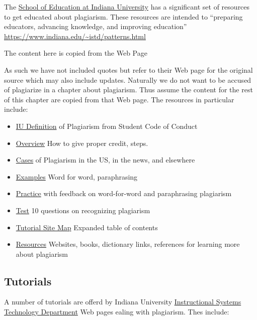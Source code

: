 The \href{http://education.indiana.edu/}{School of Education at Indiana
University} has a significant set of resources to get educated about
plagiarism. These resources are intended to ``preparing educators,
advancing knowledge, and improving education''~\cite{www-iu-plagiarism}
\url{https://www.indiana.edu/~istd/patterns.html}

The content here is copied from the Web Page


As such we have not included quotes but refer to their Web page for the
original source which may also include updates. Naturally we do not want
to be accused of plagiarize in a chapter about plagiarism.  Thus assume
the content for the rest of this chapter are copied from that Web
page. The resources in particular include:

\begin{itemize}
\item
  \href{https://www.indiana.edu/~istd/definition.html}{IU Definition} of
  Plagiarism from Student Code of Conduct
\item
  \href{https://www.indiana.edu/~istd/overview.html}{Overview} How to
  give proper credit, steps.
\item
  \href{https://www.indiana.edu/~istd/cases.html}{Cases} of Plagiarism
  in the US, in the news, and elsewhere
\item
  \href{https://www.indiana.edu/~istd/examples.html}{Examples} Word for
  word, paraphrasing
\item
  \href{https://www.indiana.edu/~istd/practice.html}{Practice} with
  feedback on word-for-word and paraphrasing plagiarism
\item
  \href{https://www.indiana.edu/~istd/test.html}{Test} 10 questions on
  recognizing plagiarism
\item
  \href{https://www.indiana.edu/~istd/sitemap.html}{Tutorial Site Map}
  Expanded table of contents
\item
  \href{https://www.indiana.edu/~istd/resources.html}{Resources}
  Websites, books, dictionary links, references for learning more about
  plagiarism
\end{itemize}

\subsection{Tutorials}\label{S:ptutorial}

A number of tutorials are offerd by Indiana University \href{http://education.indiana.edu/graduate/programs/instructional-systems/index.html}{Instructional
  Systems Technology Department}
 Web pages ealing with plagiarism. Thes include:

